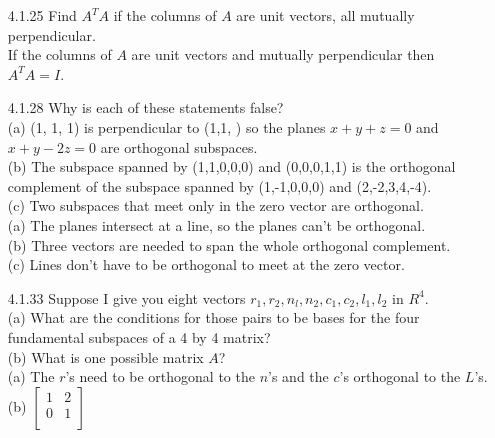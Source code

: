 \documentclass[10pt,twoside,reqno]{article}
\begin{document}
\begin{enumerate}
\item[4.1.25] Find $A^T A$ if the columns of $A$ are unit vectors, all mutually perpendicular. \\
\vspace{3mm}
\hspace{10mm}If the columns of $A$ are unit vectors and mutually perpendicular then $A^TA=I$. \\
\vspace{3mm}
\item[4.1.28] Why is each of these statements false? \\
{\addtolength{\leftskip}{5mm}
(a) (1, 1, 1) is perpendicular to (1,1, ) so the planes $x + y + z = 0$ and $x + y - 2z = 0$ are orthogonal subspaces. \\
(b) The subspace spanned by (1,1,0,0,0) and (0,0,0,1,1) is the orthogonal complement of the subspace spanned by (1,-1,0,0,0) and (2,-2,3,4,-4). \\
(c) Two subspaces that meet only in the zero vector are orthogonal. \\
}
\vspace{3mm}
{\addtolength{\leftskip}{10mm}
(a) The planes intersect at a line, so the planes can't be orthogonal. \\
(b) Three vectors are needed to span the whole orthogonal complement. \\
(c) Lines don't have to be orthogonal to meet at the zero vector. \\
}
\vspace{3mm}
\item[4.1.33] Suppose I give you eight vectors $r_1, r_2, n_l, n_2, c_1, c_2, l_1,l_2$ in $R^4$. \\
{\addtolength{\leftskip}{5mm}
(a) What are the conditions for those pairs to be bases for the four fundamental subspaces of a 4 by 4 matrix? \\
(b) What is one possible matrix $A$? \\
}
\vspace{3mm}
{\addtolength{\leftskip}{10mm}
(a) The $r$'s need to be orthogonal to the $n$'s and the $c$'s orthogonal to the $L$'s. \\
(b) 
$
\begin{bmatrix}
1&2\\
0&1\\
\end{bmatrix}
$ \\
}
\vspace{3mm}
\end{enumerate}
\end{document}

